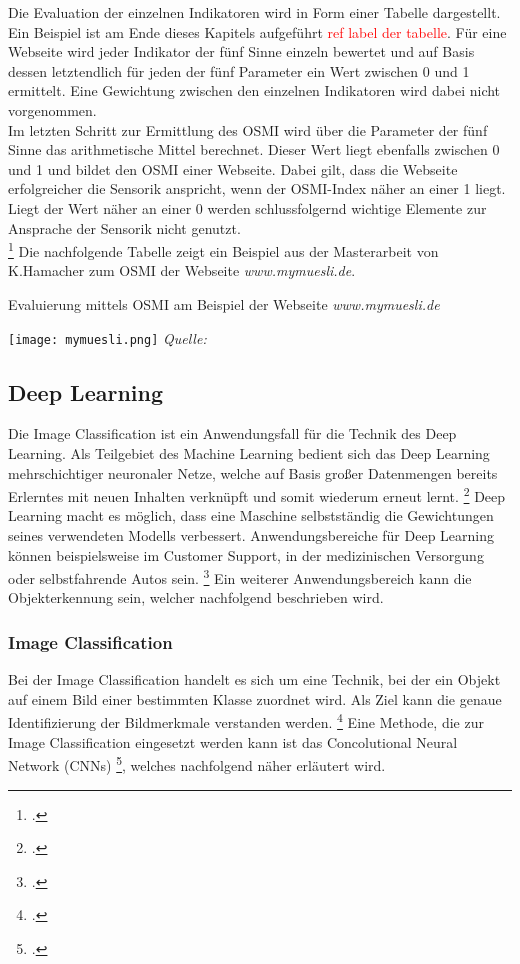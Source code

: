 Die Evaluation der einzelnen Indikatoren wird in Form einer Tabelle dargestellt. Ein Beispiel ist am Ende dieses Kapitels aufgeführt \textcolor{red}{ref label der tabelle}.
Für eine Webseite wird jeder Indikator der fünf Sinne einzeln bewertet und auf Basis dessen letztendlich für jeden der fünf Parameter ein Wert zwischen 0 und 1 ermittelt.
Eine Gewichtung zwischen den einzelnen Indikatoren wird dabei nicht vorgenommen. \\
Im letzten Schritt zur Ermittlung des \ac{OSMI} wird über die Parameter der fünf Sinne das arithmetische Mittel berechnet.
Dieser Wert liegt ebenfalls zwischen 0 und 1 und bildet den \ac{OSMI} einer Webseite. Dabei gilt, dass die Webseite erfolgreicher die Sensorik anspricht, wenn der OSMI-Index näher an einer 1 liegt.
Liegt der Wert näher an einer 0 werden schlussfolgernd wichtige Elemente zur Ansprache der Sensorik nicht genutzt. \\ \footcite[\vglf][ & 58]{hamacher2018}
Die nachfolgende Tabelle zeigt ein Beispiel aus der Masterarbeit von K.Hamacher zum \ac{OSMI} der Webseite \textit{www.mymuesli.de}.

\begin{table}[H]
    \caption{Evaluierung mittels \ac{OSMI} am Beispiel der Webseite \textit{www.mymuesli.de}}\label{fig:mymuesli}
    \texttt{[image: mymuesli.png]}
    \textit{Quelle:~\cite[][]{hamacher2018}}
\end{table}

\subsection{Deep Learning}

Die Image Classification ist ein Anwendungsfall für die Technik des Deep Learning.
Als Teilgebiet des Machine Learning bedient sich das Deep Learning mehrschichtiger neuronaler Netze, welche auf Basis großer Datenmengen bereits Erlerntes mit neuen Inhalten verknüpft und somit wiederum erneut lernt. \footcite[\vglf][ & 3]{plaat2022}
Deep Learning macht es möglich, dass eine Maschine selbstständig die Gewichtungen seines verwendeten Modells verbessert.
Anwendungsbereiche für Deep Learning können beispielsweise im Customer Support, in der medizinischen Versorgung oder selbstfahrende Autos sein. \footcite[\vglf][ & 511]{handa2021}
Ein weiterer Anwendungsbereich kann die Objekterkennung sein, welcher nachfolgend beschrieben wird.

\subsubsection{Image Classification}
Bei der Image Classification handelt es sich um eine Technik, bei der ein Objekt auf einem Bild einer bestimmten Klasse zuordnet wird. Als Ziel kann die genaue Identifizierung der Bildmerkmale verstanden werden. \footcite[\vglf][]{internationalconferenceoncomputercommunicationandinformatics2021}
Eine Methode, die zur Image Classification eingesetzt werden kann ist das Concolutional Neural Network (\acp{CNN}) \footcite[\vglf][]{internationalconferenceonadvancesinelectronics2018}, welches nachfolgend näher erläutert wird.

